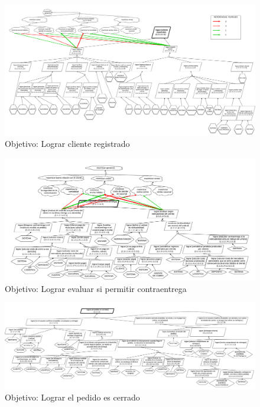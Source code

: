 \begin{figure}[ht]\begin{center}
  \includegraphics[angle=90,height=.9\textheight]{tp1/images/objetivos-cliente-registrado.pdf}
  \caption{Objetivo: Lograr cliente registrado}
\end{center}\end{figure}

\begin{figure}[ht]\begin{center}
  \includegraphics[angle=90,height=.9\textheight]{tp1/images/objetivos-permitir-contraentrega.pdf}
  \caption{Objetivo: Lograr evaluar si permitir contraentrega}
\end{center}\end{figure}

\begin{figure}[ht]\begin{center}
  \includegraphics[angle=90,height=.9\textheight]{tp1/images/objetivos-cerrar-pedido.pdf}
  \caption{Objetivo: Lograr el pedido es cerrado}
\end{center}\end{figure}
